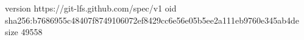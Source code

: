 version https://git-lfs.github.com/spec/v1
oid sha256:b7686955c48407f8749106072ef8429cc6e56e05b5ee2a111eb9760e345ab4de
size 49558
